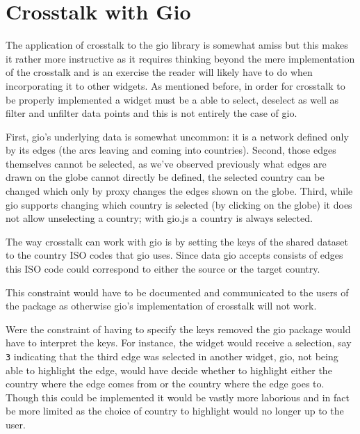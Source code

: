 \documentclass[
]{krantz}
\makeatletter
\newenvironment{Shaded}{\begin{snugshade}}{\end{snugshade}}
\newcommand{\CommentTok}[1]{\textcolor[rgb]{0.37,0.37,0.37}{\textit{#1}}}
\newcommand{\DataTypeTok}[1]{\textcolor[rgb]{0.27,0.27,0.27}{#1}}
\newcommand{\KeywordTok}[1]{\textcolor[rgb]{0.27,0.27,0.27}{\textbf{#1}}}
\newcommand{\NormalTok}[1]{#1}
\newcommand{\OperatorTok}[1]{\textcolor[rgb]{0.43,0.43,0.43}{\textbf{#1}}}
\newcommand{\StringTok}[1]{\textcolor[rgb]{0.5,0.5,0.5}{#1}}
\newenvironment{kframe}{%
\medskip{}
\setlength{\fboxsep}{.8em}
 \def\at@end@of@kframe{}%
 \ifinner\ifhmode%
  \def\at@end@of@kframe{\end{minipage}}%
  \begin{minipage}{\columnwidth}%
 \fi\fi%
 \def\FrameCommand##1{\hskip\@totalleftmargin \hskip-\fboxsep
 \colorbox{shadecolor}{##1}\hskip-\fboxsep
     \hskip-\linewidth \hskip-\@totalleftmargin \hskip\columnwidth}%
 \MakeFramed {\advance\hsize-\width
   \@totalleftmargin\z@ \linewidth\hsize
   \@setminipage}}%
 {\par\unskip\endMakeFramed%
 \at@end@of@kframe}
\renewenvironment{Shaded}{\begin{kframe}}{\end{kframe}}
\makeatother
\begin{document}
\hypertarget{linking-widgets-gio}{%
\section{Crosstalk with Gio}\label{linking-widgets-gio}}

The application of crosstalk to the gio library is somewhat amiss but this makes it rather more instructive as it requires thinking beyond the mere implementation of the crosstalk and is an exercise the reader will likely have to do when incorporating it to other widgets. As mentioned before, in order for crosstalk to be properly implemented a widget must be a able to select, deselect as well as filter and unfilter data points and this is not entirely the case of gio.

First, gio's underlying data is somewhat uncommon: it is a network defined only by its edges (the arcs leaving and coming into countries). Second, those edges themselves cannot be selected, as we've observed previously what edges are drawn on the globe cannot directly be defined, the selected country can be changed which only by proxy changes the edges shown on the globe. Third, while gio supports changing which country is selected (by clicking on the globe) it does not allow unselecting a country; with gio.js a country is always selected.

The way crosstalk can work with gio is by setting the keys of the shared dataset to the country ISO codes that gio uses. Since data gio accepts consists of edges this ISO code could correspond to either the source or the target country.

\begin{Shaded}
\end{Shaded}

This constraint would have to be documented and communicated to the users of the package as otherwise gio's implementation of crosstalk will not work.

Were the constraint of having to specify the keys removed the gio package would have to interpret the keys. For instance, the widget would receive a selection, say \texttt{3} indicating that the third edge was selected in another widget, gio, not being able to highlight the edge, would have decide whether to highlight either the country where the edge comes from or the country where the edge goes to. Though this could be implemented it would be vastly more laborious and in fact be more limited as the choice of country to highlight would no longer up to the user.
\end{document}
